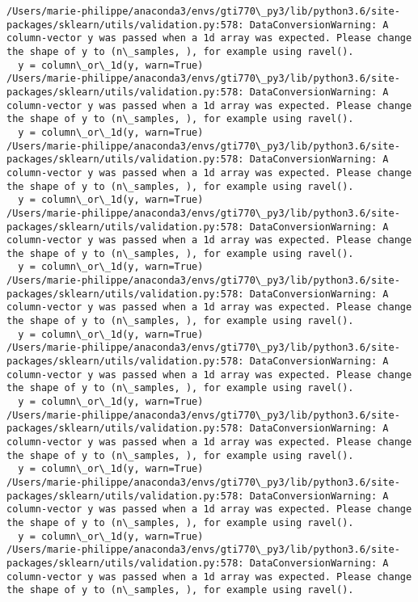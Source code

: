 \documentclass[11pt]{article}
\begin{document}
    \begin{Verbatim}[commandchars=\\\{\}]
/Users/marie-philippe/anaconda3/envs/gti770\_py3/lib/python3.6/site-packages/sklearn/utils/validation.py:578: DataConversionWarning: A column-vector y was passed when a 1d array was expected. Please change the shape of y to (n\_samples, ), for example using ravel().
  y = column\_or\_1d(y, warn=True)
/Users/marie-philippe/anaconda3/envs/gti770\_py3/lib/python3.6/site-packages/sklearn/utils/validation.py:578: DataConversionWarning: A column-vector y was passed when a 1d array was expected. Please change the shape of y to (n\_samples, ), for example using ravel().
  y = column\_or\_1d(y, warn=True)
/Users/marie-philippe/anaconda3/envs/gti770\_py3/lib/python3.6/site-packages/sklearn/utils/validation.py:578: DataConversionWarning: A column-vector y was passed when a 1d array was expected. Please change the shape of y to (n\_samples, ), for example using ravel().
  y = column\_or\_1d(y, warn=True)
/Users/marie-philippe/anaconda3/envs/gti770\_py3/lib/python3.6/site-packages/sklearn/utils/validation.py:578: DataConversionWarning: A column-vector y was passed when a 1d array was expected. Please change the shape of y to (n\_samples, ), for example using ravel().
  y = column\_or\_1d(y, warn=True)
/Users/marie-philippe/anaconda3/envs/gti770\_py3/lib/python3.6/site-packages/sklearn/utils/validation.py:578: DataConversionWarning: A column-vector y was passed when a 1d array was expected. Please change the shape of y to (n\_samples, ), for example using ravel().
  y = column\_or\_1d(y, warn=True)
/Users/marie-philippe/anaconda3/envs/gti770\_py3/lib/python3.6/site-packages/sklearn/utils/validation.py:578: DataConversionWarning: A column-vector y was passed when a 1d array was expected. Please change the shape of y to (n\_samples, ), for example using ravel().
  y = column\_or\_1d(y, warn=True)
/Users/marie-philippe/anaconda3/envs/gti770\_py3/lib/python3.6/site-packages/sklearn/utils/validation.py:578: DataConversionWarning: A column-vector y was passed when a 1d array was expected. Please change the shape of y to (n\_samples, ), for example using ravel().
  y = column\_or\_1d(y, warn=True)
/Users/marie-philippe/anaconda3/envs/gti770\_py3/lib/python3.6/site-packages/sklearn/utils/validation.py:578: DataConversionWarning: A column-vector y was passed when a 1d array was expected. Please change the shape of y to (n\_samples, ), for example using ravel().
  y = column\_or\_1d(y, warn=True)
/Users/marie-philippe/anaconda3/envs/gti770\_py3/lib/python3.6/site-packages/sklearn/utils/validation.py:578: DataConversionWarning: A column-vector y was passed when a 1d array was expected. Please change the shape of y to (n\_samples, ), for example using ravel().

\end{Verbatim}
\end{document}
